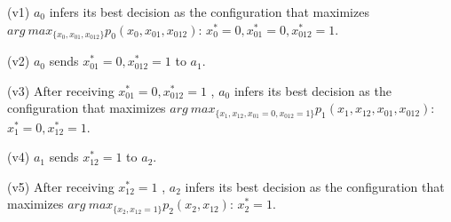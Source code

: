 \documentclass{article}
\begin{document}
\vspace{0.1in}\noindent (v1) $a_0$ infers its best decision as the configuration
that maximizes $arg \ max_{\{x_{0},x_{01},x_{012}\}}p_0(x_{0},x_{01},x_{012})$:
$x^*_{0}=0,x^*_{01}=0,x^*_{012}=1$.


\vspace{0.1in}\noindent (v2) $a_0$ sends 
$x^*_{01}=0,x^*_{012}=1$ to $a_1$.


\vspace{0.1in}\noindent (v3) After receiving $x^*_{01}=0,x^*_{012}=1$ , $a_0$
infers its best decision as the configuration that maximizes $arg \
max_{\{x_{1},x_{12},x_{01}=0,x_{012}=1\}}p_1(x_{1},x_{12},x_{01},x_{012})$:
$x^*_{1}=0,x^*_{12}=1$.


\vspace{0.1in}\noindent (v4) $a_1$ sends 
$x^*_{12}=1$ to $a_2$.


\vspace{0.1in}\noindent (v5) After receiving $x^*_{12}=1$ , $a_2$
infers its best decision as the configuration that maximizes $arg \
max_{\{x_{2},x_{12}=1\}}p_2(x_{2},x_{12})$:
$x^*_{2}=1$.
\end{document}
